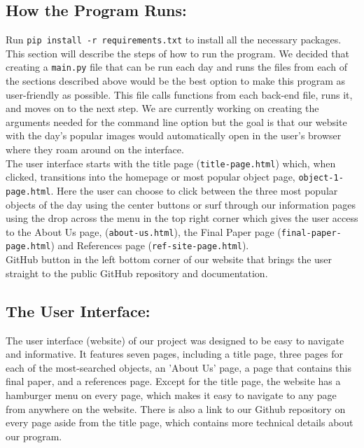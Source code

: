 \documentclass[12pt,letterpaper]{article}
\begin{document}
\subsection*{How the Program Runs:}

\quad Run \texttt{pip install -r requirements.txt} to install all the necessary packages.\\

\quad This section will describe the steps of how to run the program. We  decided that 
creating a \texttt{main.py} file that can be run each day and runs the files from 
each of the sections described above would be the best option to make this program 
as user-friendly as possible. This file calls functions from each back-end file, 
runs it, and moves on to the next step. We are currently working on creating the 
arguments needed for the command line option but the goal is that our website with 
the day's popular images would automatically open in the user's browser where they 
roam around on the interface.\\

\quad The user interface starts with the title page (\texttt{title-page.html}) which, when 
clicked, transitions into the homepage or most popular object page,
\texttt{object-1-page.html}. Here the user can choose to click between the three most 
popular objects of the day using the center buttons or surf through our information 
pages using the drop across the menu in the top right corner which gives the user access 
to the About Us page, (\texttt{about-us.html}), the Final Paper page
 (\texttt{final-paper-page.html}) and References page (\texttt{ref-site-page.html}). \\

\quad GitHub button in the left bottom corner of our website that brings 
the user straight to the public GitHub repository and documentation. \\

\subsection*{The User Interface:}
\quad The user interface (website) of our project was designed to be easy to navigate 
and informative. It features seven pages, including a title page, three pages for each 
of the most-searched objects, an 'About Us' page, a page that contains this final paper, 
and a references page. Except for the title page, the website has a hamburger menu on 
every page, which makes it easy to navigate to any page from anywhere on the website. 
There is also a link to our Github repository on every page aside from the title page, 
which contains more technical details about our program. \\
\end{document}
